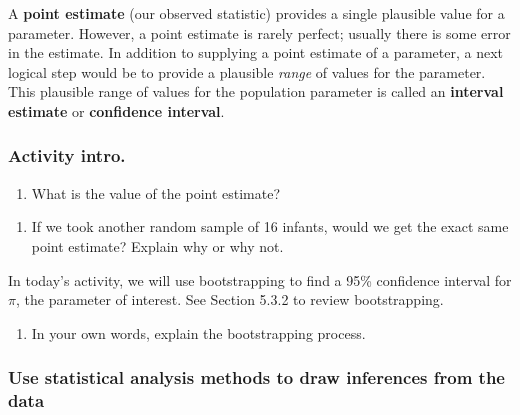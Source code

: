 \documentclass[
]{report}
\providecommand{\tightlist}{%
  \setlength{\itemsep}{0pt}\setlength{\parskip}{0pt}}
\begin{document}
A \textbf{point estimate} (our observed statistic) provides a single plausible value for a parameter. However, a point estimate is rarely perfect; usually there is some error in the estimate. In addition to supplying a point estimate of a parameter, a next logical step would be to provide a plausible \emph{range} of values for the parameter. This plausible range of values for the population parameter is called an \textbf{interval estimate} or \textbf{confidence interval}.

\hypertarget{activity-intro.}{%
\subsubsection*{Activity intro.}\label{activity-intro.}}

\begin{enumerate}
\def\labelenumi{\arabic{enumi}.}
\tightlist
\item
  What is the value of the point estimate?
\end{enumerate}

\vspace{0.5in}

\begin{enumerate}
\def\labelenumi{\arabic{enumi}.}
\setcounter{enumi}{1}
\tightlist
\item
  If we took another random sample of 16 infants, would we get the exact same point estimate? Explain why or why not.
\end{enumerate}

\vspace{0.5in}

In today's activity, we will use bootstrapping to find a 95\% confidence interval for \(\pi\), the parameter of interest. See Section 5.3.2 to review bootstrapping.

\begin{enumerate}
\def\labelenumi{\arabic{enumi}.}
\setcounter{enumi}{2}
\tightlist
\item
  In your own words, explain the bootstrapping process.
  \vspace{0.5in}
\end{enumerate}

\hypertarget{use-statistical-analysis-methods-to-draw-inferences-from-the-data-1}{%
\subsubsection*{Use statistical analysis methods to draw inferences from the data}\label{use-statistical-analysis-methods-to-draw-inferences-from-the-data-1}}
\end{document}
